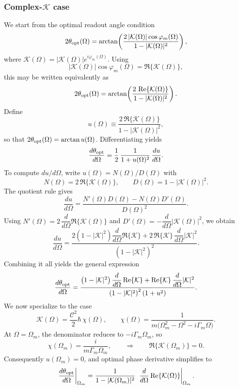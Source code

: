 \subsubsection*{Complex-\(\mathcal{K}\) case}
We start from the optimal readout angle condition
\[
2\theta_{\rm opt}(\Omega)=
\arctan\!\left(
\frac{2\,|\mathcal K(\Omega)|\cos\varphi_m(\Omega)}{1-|\mathcal K(\Omega)|^2}
\right),
\]
where \(\mathcal K(\Omega)=|\mathcal K(\Omega)|e^{i\varphi_m(\Omega)}\). Using
\[
|\mathcal K(\Omega)|\cos\varphi_m(\Omega)=\Re\{\mathcal K(\Omega)\},
\]
this may be written equivalently as
\[
2\theta_{\rm opt}(\Omega)=
\arctan\!\left(
\frac{2\,\Re\{\mathcal K(\Omega)\}}{1-|\mathcal K(\Omega)|^2}
\right).
\]
Define
\[
u(\Omega)\equiv \frac{2\,\Re\{\mathcal K(\Omega)\}}{1-|\mathcal K(\Omega)|^2},
\]
so that \(2\theta_{\rm opt}(\Omega)=\arctan u(\Omega)\). Differentiating yields
\[
\frac{d\theta_{\rm opt}}{d\Omega}
=\frac{1}{2}\,\frac{1}{1+u(\Omega)^2}\,\frac{du}{d\Omega}.
\]
To compute \(du/d\Omega\), write \(u(\Omega)=N(\Omega)/D(\Omega)\) with
\begin{equation}
N(\Omega)=2\,\Re\{\mathcal K(\Omega)\},\qquad D(\Omega)=1-|\mathcal K(\Omega)|^2.
\end{equation}
The quotient rule gives
\begin{equation}
\frac{du}{d\Omega}
=
\frac{N'(\Omega)D(\Omega)-N(\Omega)D'(\Omega)}{D(\Omega)^2}.
\end{equation}
Using \(N'(\Omega)=2\,\dfrac{d}{d\Omega}\Re\{\mathcal K(\Omega)\}\) and
\(D'(\Omega)=-\dfrac{d}{d\Omega}|\mathcal K(\Omega)|^2\), we obtain
\[
\frac{du}{d\Omega}
=
\frac{
2\left(1-|\mathcal K|^2\right)\dfrac{d}{d\Omega}\Re\{\mathcal K\}
+
2\,\Re\{\mathcal K\}\,\dfrac{d}{d\Omega}|\mathcal K|^2
}{
\left(1-|\mathcal K|^2\right)^2
}.
\label{eq:du}
\]
Combining it all yields the general expression
\[
\frac{d\theta_{\rm opt}}{d\Omega}
=
\frac{
\left(1-|\mathcal K|^2\right)\dfrac{d}{d\Omega}\Re\{\mathcal K\}
+
\Re\{\mathcal K\}\,\dfrac{d}{d\Omega}|\mathcal K|^2
}{
\left(1-|\mathcal K|^2\right)^2\left(1+u^2\right)
}.
\]
We now specialize to the case
\[
\mathcal K(\Omega)=\frac{\mathcal C^2}{2}\hbar\,\chi(\Omega),
\qquad
\chi(\Omega)=\frac{1}{m\big(\Omega_m^2-\Omega^2-i\Gamma_m\Omega\big)}.
\]
At \(\Omega=\Omega_m\), the denominator reduces to \(-i\Gamma_m\Omega_m\), so
\[
\chi(\Omega_m)=\frac{i}{m\Gamma_m\Omega_m},
\qquad\Rightarrow\qquad
\Re\{\mathcal K(\Omega_m)\}=0.
\]
Consequently \(u(\Omega_m)=0\), and optimal phase derivative simplifies to
\[
\left.\frac{d\theta_{\rm opt}}{d\Omega}\right|_{\Omega_m}
=
\frac{1}{1-|\mathcal K(\Omega_m)|^2}\;
\left.\frac{d}{d\Omega}\Re\{\mathcal K(\Omega)\}\right|_{\Omega_m}.
\]
